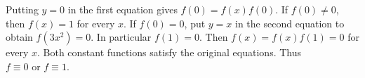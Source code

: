 Putting $y=0$ in the first equation gives $f(0)=f(x)f(0)$. If $f(0)\ne0$, then $f(x)=1$ for every $x$. If $f(0)=0$, put $y=x$ in the second equation to obtain $f(3x^2)=0$. In particular $f(1)=0$. Then $f(x)=f(x)f(1)=0$ for every $x$. Both constant functions satisfy the original equations. Thus $\boxed{f\equiv0\text{ or }f\equiv1}$.
